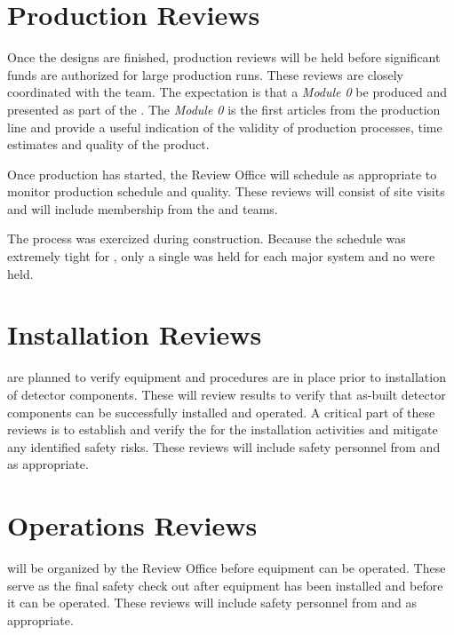 \section{Production Reviews}

Once the designs are finished, production reviews will be held before
significant funds are authorized for large production runs. These
reviews are closely coordinated with the  team. The
expectation is that a \textit{Module 0} be produced and presented as
part of the . The \textit{Module 0} is the first articles
from the production line and provide a useful indication of the
validity of production processes, time estimates and quality of the
product.

Once production has started, the Review Office will schedule  as
appropriate to monitor production schedule and quality. These reviews
will consist of site visits and will include membership from the
 and  teams.

The  process was exercized during 
construction. Because the schedule was extremely tight for
, only a single  was held for each major
system and no  were held.


\section{Installation Reviews}

 are planned to verify equipment and procedures are in
place prior to installation of detector components. These will
review  results to verify that as-built detector
components can be successfully installed and operated. A critical part
of these reviews is to establish and verify the  for the
installation activities and mitigate any identified safety risks.  These reviews
will include safety personnel from  and  as
appropriate.


\section{Operations Reviews}

 will be organized by the Review Office before equipment
can be operated.  These serve as the final safety check out after
equipment has been installed and before it can be operated. These
reviews will include safety personnel from  and
 as appropriate.

